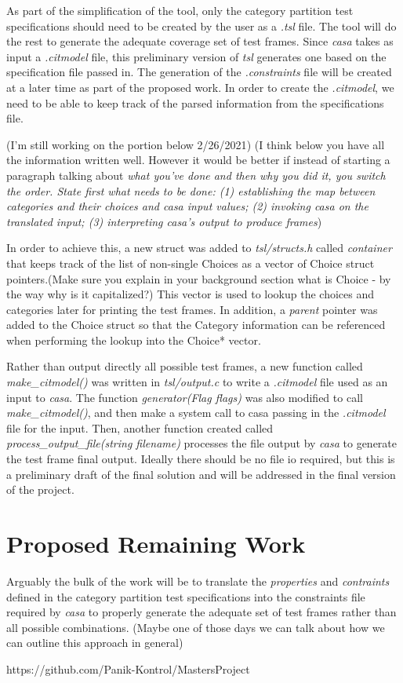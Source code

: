\documentclass[a4full,12pt]{article}
\newcommand{\eas}[1]{{\color{blue}\sf ({#1})}}
\newcommand{\ag}[1]{{\color{red}\sf ({#1})}}
\begin{document}
As part of the simplification of the tool, only the category partition test specifications
  should need to be created by the user as a \emph{.tsl} file. The tool will do the rest to
  generate the adequate coverage set of test frames. Since \emph{casa} takes as input a 
  \emph{.citmodel} file, this preliminary version of \emph{tsl} generates one based on the
  specification file passed in. The generation of the \emph{.constraints} file will be created
  at a later time as part of the proposed work. In order to create the \emph{.citmodel}, we need
  to be able to keep track of the parsed information from the specifications file.
  
\ag{I'm still working on the portion below 2/26/2021}    
\eas{I think below you have all the information written well. However it would be better if instead of starting a paragraph
  talking about \em{what you've done} and then \em{why you did it}, you switch the order. State first what needs to be done:
  (1) establishing the map between categories and their choices and casa input values;
  (2) invoking casa on the translated input;
  (3) interpreting casa's output to produce frames}
  
In order to achieve this, a new struct was added to \emph{tsl/structs.h} called \emph{container} that
  keeps track of the list of non-single Choices as a vector of Choice struct
  pointers.\eas{Make sure you explain in your background section what is Choice - by the way why is it capitalized?} This vector is used to lookup the choices and categories later for
  printing the test frames. In addition, a \emph{parent} pointer was added to
  the Choice struct so that the Category information can be referenced when
  performing the lookup into the Choice* vector.
  
Rather than output directly all possible test frames, a new function called
  \emph{make\_citmodel()} was written in \emph{tsl/output.c} to write a 
  \emph{.citmodel} file used as an input to \emph{casa}. The function
  \emph{generator(Flag flags)} was also modified to call \emph{make\_citmodel()},
  and then make a system call to casa passing in the \emph{.citmodel} file for
  the input. Then, another function created  called
  \emph{process\_output\_file(string filename)} processes the file output by
  \emph{casa} to generate the test frame final output. Ideally there should be
  no file io required, but this is a preliminary draft of the final solution
  and will be addressed in the final version of the project.
  
  \section{Proposed Remaining Work}
Arguably the bulk of the work will be to translate the \emph{properties} and 
  \emph{contraints} defined in the category partition test specifications into
  the constraints file required by \emph{casa} to properly generate the adequate
  set of test frames rather than all possible combinations. \eas{Maybe one of those days we can talk about how we can outline this approach in general}
  
  https://github.com/Panik-Kontrol/MastersProject
\end{document}
